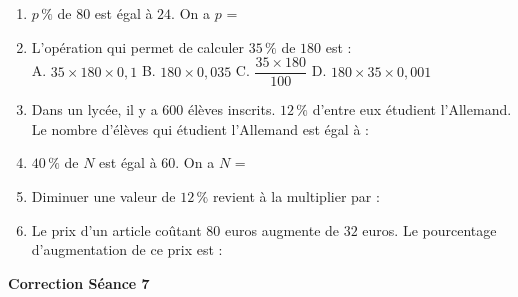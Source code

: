\documentclass[a4paper,11pt]{article}
\begin{document}
\vspace*{2cm}
\begin{seanceD}{} %

\begin{enumerate}
\item $p\,\%$ de $80$ est égal à $24$. On a $p$ = \dotfill

\item L'opération qui permet de calculer $35\,\%$ de $180$ est : \\
A. $35 \times 180 \times 0{,}1$ \quad B. $180 \times 0{,}035$ \quad C. $\dfrac{35 \times 180}{100}$ \quad D. $180 \times 35 \times 0{,}001$\dotfill

\item Dans un lycée, il y a $600$ élèves inscrits. $12\,\%$ d'entre eux étudient l'Allemand.
Le nombre d'élèves qui étudient l'Allemand est égal à : \dotfill

\item $40\,\%$ de $N$ est égal à $60$. On a $N$ = \dotfill

\item Diminuer une valeur de $12\,\%$ revient à la multiplier par : \dotfill

\item Le prix d'un article coûtant $80$ euros augmente de $32$ euros.
Le pourcentage d'augmentation de ce prix est : \dotfill

\end{enumerate}

\end{seanceD} %
\vspace{0.5cm}
\begin{center}

\textbf{\textcolor{Couleur8}{Correction Séance 7}}\\
\vspace{2mm}

\end{center}
\end{document}
